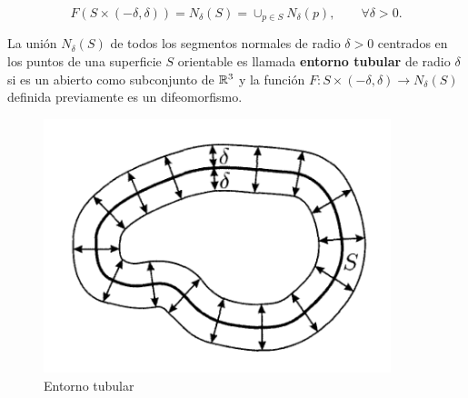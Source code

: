 \begin{equation*}
    F(S \times (-\delta, \delta)) = N_\delta(S)=\cup_{p\in S} N_\delta(p), \qquad \forall \delta > 0.
\end{equation*}

\begin{definition}
La unión $N_\delta(S)$ de todos los segmentos normales de radio $\delta > 0$ centrados en los puntos de una superficie $S$ orientable es llamada \textbf{entorno tubular} de radio $\delta$ si es un abierto como subconjunto de $\mathbb{R}^3$ y la función $F: S \times (-\delta, \delta) \longrightarrow N_\delta(S)$ definida previamente es un difeomorfismo.
\end{definition}

\begin{figure}[h]
  \centering
  \includegraphics[width=0.9\textwidth]{gfx/tubular_neighbourhoods.png}
  \caption{Entorno tubular}
\end{figure}

